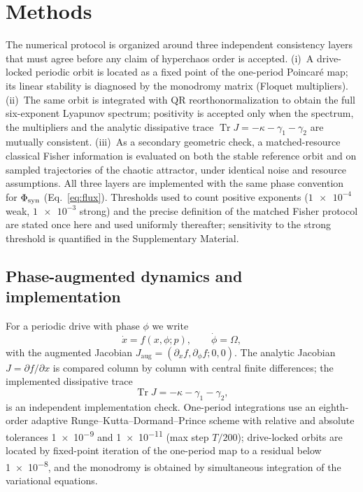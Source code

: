 \documentclass[Phys]{SciPost}
\newcommand{\Tr}{\operatorname{Tr}}
\begin{document}
\section{Methods}

The numerical protocol is organized around three independent consistency layers that must agree before any claim of hyperchaos order is accepted. (i)~A drive-locked periodic orbit is located as a fixed point of the one-period Poincaré map; its linear stability is diagnosed by the monodromy matrix (Floquet multipliers). (ii)~The same orbit is integrated with QR reorthonormalization to obtain the full six-exponent Lyapunov spectrum; positivity is accepted only when the spectrum, the multipliers and the analytic dissipative trace $\Tr J=-\kappa-\gamma_1-\gamma_2$ are mutually consistent. (iii)~As a secondary geometric check, a matched-resource classical Fisher information is evaluated on both the stable reference orbit and on sampled trajectories of the chaotic attractor, under identical noise and resource assumptions. All three layers are implemented with the same phase convention for $\Phi_{\rm syn}$ (Eq.~\eqref{eq:flux}). Thresholds used to count positive exponents ($\num{1e-4}$ weak, $\num{1e-3}$ strong) and the precise definition of the matched Fisher protocol are stated once here and used uniformly thereafter; sensitivity to the strong threshold is quantified in the Supplementary Material.

\subsection{Phase-augmented dynamics and implementation}

For a periodic drive with phase $\phi$ we write
\begin{equation}\label{eq:augmented}
\dot{x}=f(x,\phi;p),\qquad \dot\phi=\Omega,
\end{equation}
with the augmented Jacobian $J_{\mathrm{aug}}=(\partial_x f,\partial_\phi f;0,0)$. The analytic Jacobian $J=\partial f/\partial x$ is compared column by column with central finite differences; the implemented dissipative trace
\begin{equation}\label{eq:trace}
\Tr J=-\kappa-\gamma_1-\gamma_2,
\end{equation}
is an independent implementation check. One-period integrations use an eighth-order adaptive Runge--Kutta--Dormand--Prince scheme \cite{dormand1980} with relative and absolute tolerances \num{1e-9} and \num{1e-11} (max step $T/200$); drive-locked orbits are located by fixed-point iteration of the one-period map to a residual below \num{1e-8}, and the monodromy is obtained by simultaneous integration of the variational equations.
\end{document}
